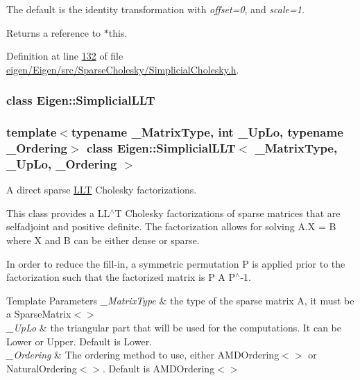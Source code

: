 The default is the identity transformation with {\itshape offset=0}, and {\itshape scale=1}.

\begin{DoxyReturn}{Returns}
a reference to {\ttfamily $\ast$this}. 
\end{DoxyReturn}


Definition at line \hyperlink{eigen_2_eigen_2src_2_sparse_cholesky_2_simplicial_cholesky_8h_source_l00132}{132} of file \hyperlink{eigen_2_eigen_2src_2_sparse_cholesky_2_simplicial_cholesky_8h_source}{eigen/\+Eigen/src/\+Sparse\+Cholesky/\+Simplicial\+Cholesky.\+h}.

\label{class_eigen_1_1_simplicial_l_l_t}
\subsubsection{class Eigen\+:\+:Simplicial\+L\+LT}
\subsubsection*{template$<$typename \+\_\+\+Matrix\+Type, int \+\_\+\+Up\+Lo, typename \+\_\+\+Ordering$>$\newline
class Eigen\+::\+Simplicial\+L\+L\+T$<$ \+\_\+\+Matrix\+Type, \+\_\+\+Up\+Lo, \+\_\+\+Ordering $>$}

A direct sparse \hyperlink{group___cholesky___module_class_eigen_1_1_l_l_t}{L\+LT} Cholesky factorizations. 

This class provides a L\+L$^\wedge$T Cholesky factorizations of sparse matrices that are selfadjoint and positive definite. The factorization allows for solving A.\+X = B where X and B can be either dense or sparse.

In order to reduce the fill-\/in, a symmetric permutation P is applied prior to the factorization such that the factorized matrix is P A P$^\wedge$-\/1.


\begin{DoxyTemplParams}{Template Parameters}
{\em \+\_\+\+Matrix\+Type} & the type of the sparse matrix A, it must be a Sparse\+Matrix$<$$>$ \\
\hline
{\em \+\_\+\+Up\+Lo} & the triangular part that will be used for the computations. It can be Lower or Upper. Default is Lower. \\
\hline
{\em \+\_\+\+Ordering} & The ordering method to use, either A\+M\+D\+Ordering$<$$>$ or Natural\+Ordering$<$$>$. Default is A\+M\+D\+Ordering$<$$>$\\
\hline
\end{DoxyTemplParams}


